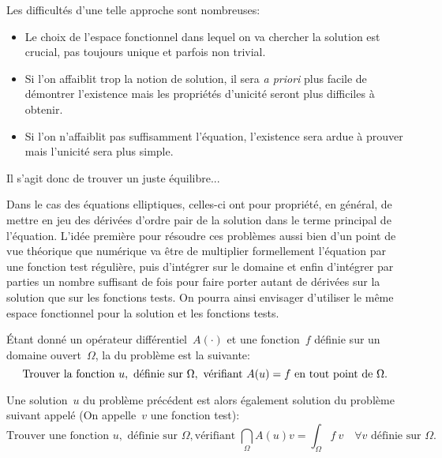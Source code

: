 \medskip
Les difficultés d'une telle approche sont nombreuses:
\begin{itemize}
  \item Le choix de l'espace fonctionnel dans lequel on va chercher la solution est crucial, pas toujours unique et parfois non trivial.
  \item Si l'on affaiblit trop la notion de solution, il sera \emph{a priori} plus facile de démontrer l'existence mais les propriétés d'unicité seront plus difficiles à obtenir.
  \item Si l'on n'affaiblit pas suffisamment l'équation, l'existence sera ardue à prouver mais l'unicité sera plus simple.
\end{itemize}


\medskip
Il s'agit donc de trouver un juste équilibre...

Dans le cas des équations elliptiques, celles-ci ont pour propriété, en général, de mettre en jeu des dérivées d'ordre pair de la solution dans le terme principal de l'équation. L'idée première pour résoudre ces problèmes aussi bien d'un point de vue théorique que numérique va être de multiplier formellement l'équation par une fonction test régulière, puis d'intégrer sur le domaine et enfin d'intégrer par parties un nombre suffisant de fois pour faire porter autant de dérivées sur la solution que sur les fonctions tests. On pourra ainsi envisager d'utiliser le même espace fonctionnel pour la solution et les fonctions tests.

\medskip
\begin{definition}
Étant donné un opérateur différentiel~$A(\cdot)$ et une fonction~$f$ définie sur un domaine ouvert~$\Omega$, la  du problème est la suivante:
\begin{equation}\label{Eq-FormulationForte}
  \text{Trouver la fonction~} u, \text{ définie sur~} \Omega, 
  \text{ vérifiant~} A(u)=f \text{ en tout point de~} \Omega.
\end{equation}

\medskip
Une solution~$u$ du problème précédent est alors également solution du problème suivant
appelé  (On appelle~$v$ une fonction test):
\begin{equation}\label{Eq-FormulationFaible}
  \text{Trouver une fonction~} u, \text{ définie sur~} \Omega,  
  \text{vérifiant~} \dint_\Omega A(u)v = \int_\Omega f\ v \quad \forall v
  \text{ définie sur~}\Omega.
\end{equation}
\end{definition}

